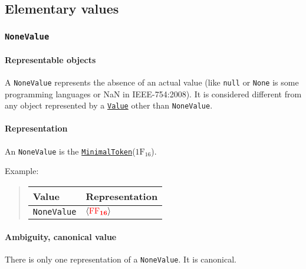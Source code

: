 \documentclass[headings=normal, headsepline, numbers=noenddot, fleqn, a4paper]{scrartcl}
\newcommand{\HexNumber}[1]{\mathrm{#1}_{16}}
\newcommand{\DborSyntaxIdent}[1]{\texttt{#1}}
\newcommand{\DborSyntaxIdentRef}[1]{\hyperlink{sec:def:#1}{\DborSyntaxIdent{#1}}}
\newcommand{\DborFirstByte}[2]{\mathbf{\textcolor{#1}{\HexNumber{#2}}}}
\newcommand{\DborFirstByteNone}[1]{\DborFirstByte{red}{#1}}
\begin{document}
    \subsection{Elementary values}

    \subsubsection{\DborSyntaxIdent{NoneValue}}
    \label{sec:def:NoneValue}
    \hypertarget{sec:def:NoneValue}{}

    \paragraph{Representable objects}

    A \DborSyntaxIdent{NoneValue} represents the absence of an actual value (like \texttt{null} or \texttt{None} is some
    programming languages or NaN in IEEE-754:2008).
    It is considered different from any object represented by a \DborSyntaxIdentRef{Value} other than
    \DborSyntaxIdent{NoneValue}.

    \paragraph{Representation}

    An \DborSyntaxIdent{NoneValue} is the \DborSyntaxIdentRef{MinimalToken}($\HexNumber{1F}$).

    \smallskip
    \noindent
    Example:
    \nolinebreak
    \begin{quote}    
        \begin{tabular}{ll}
            \toprule
            Value & Representation \\
            \midrule
            \DborSyntaxIdent{NoneValue} 
                & $\langle \DborFirstByteNone{FF} \rangle$ \\
            \bottomrule
        \end{tabular}
    \end{quote}

    \paragraph{Ambiguity, canonical value}

    There is only one representation of a \DborSyntaxIdent{NoneValue}.
    It is canonical.
\end{document}
